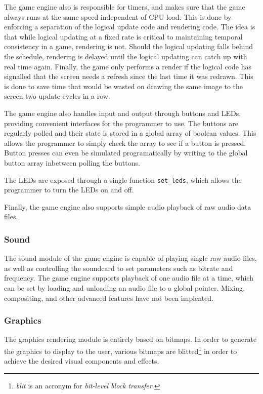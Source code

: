     The game engine also is responsible for timers, and makes sure that the game always runs at the same speed independent of CPU load.
    This is done by enforcing a separation of the logical update code and rendering code.
    The idea is that while logical updating at a fixed rate is critical to maintaining temporal consistency in a game, rendering is not.
    Should the logical updating falls behind the schedule, rendering is delayed until the logical updating can catch up with real time again.
    Finally, the game only performs a render if the logical code has signalled that the screen needs a refresh since the last time it was redrawn.
    This is done to save time that would be wasted on drawing the same image to the screen two update cycles in a row.

    The game engine also handles input and output through buttons and LEDs, providing convenient interfaces for the programmer to use.
    The buttons are regularly polled and their state is stored in a global array of boolean values.
    This allows the programmer to simply check the array to see if a button is pressed.
    Button presses can even be simulated programatically by writing to the global button array inbetween polling the buttons.

    The LEDs are exposed through a single function \texttt{set_leds}, which allows the programmer to turn the LEDs on and off.


    Finally, the game engine also supports simple audio playback of raw audio data files.

\subsubsection{Sound}
The sound module of the game engine is capable of playing single raw audio files, as well as controlling the soundcard to set parameters such as bitrate and frequency.
The game engine supports playback of one audio file at a time, which can be set by loading and unloading an audio file to a global pointer.
Mixing, compositing, and other advanced features have not been implented.

\subsubsection{Graphics}
The graphics rendering module is entirely based on bitmaps.
In order to generate the graphics to display to the user, various bitmaps are blitted\footnote{\textit{blit} is an acronym for \textit{bit-level block transfer}.} in order to achieve the desired visual components and effects.


